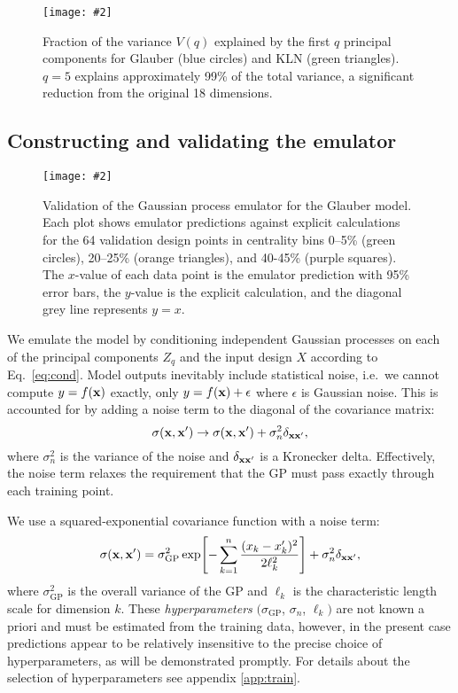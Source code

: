 \documentclass[aps,prc,reprint,superscriptaddress,amsmath]{revtex4-1}
\newcommand{\colfig}[3][t]{
  \begin{figure}[#1]
    \texttt{[image: \#2]}
    \caption{\label{fig:#2}#3}
  \end{figure}
}
\newcommand{\widefig}[3][t]{
  \begin{figure*}[#1]
    \texttt{[image: \#2]}
    \caption{\label{fig:#2}#3}
  \end{figure*}
}
\begin{document}
\colfig[t]{pc_var}{
  Fraction of the variance $V(q)$ explained by the first $q$ principal components for Glauber (blue circles) and KLN (green triangles).
  $q = 5$ explains approximately 99\% of the total variance, a significant reduction from the original 18 dimensions.
}

\subsection{Constructing and validating the emulator}

\widefig{validation}{
  Validation of the Gaussian process emulator for the Glauber model.
  Each plot shows emulator predictions against explicit calculations for the 64 validation design points in centrality bins 0--5\% (green circles), 20--25\% (orange triangles), and 40-45\% (purple squares).
  The $x$-value of each data point is the emulator prediction with 95\% error bars, the $y$-value is the explicit calculation, and the diagonal grey line represents $y = x$.
}

We emulate the model by conditioning independent Gaussian processes on each of the principal components $Z_q$ and the input design $X$ according to Eq.~\eqref{eq:cond}.
Model outputs inevitably include statistical noise, i.e.\ we cannot compute $y = f(\mathbf x)$ exactly, only $y = f(\mathbf x) + \epsilon$ where $\epsilon$ is Gaussian noise.
This is accounted for by adding a noise term to the diagonal of the covariance matrix:
\begin{equation*}
  \sigma(\mathbf x, \mathbf x') \rightarrow \sigma(\mathbf x, \mathbf x') + \sigma^2_n\delta_{\mathbf x\mathbf x'},
\end{equation*}
where $\sigma^2_n$ is the variance of the noise and $\delta_{\mathbf x\mathbf x'}$ is a Kronecker delta.
Effectively, the noise term relaxes the requirement that the GP must pass exactly through each training point.

We use a squared-exponential covariance function with a noise term:
\begin{equation}
  \sigma(\mathbf x, \mathbf x') = \sigma_\text{GP}^2 \exp\Biggl[ -\sum_{k=1}^n \frac{(x_k - x'_k)^2}{2\ell_k^2} \Biggr] + \sigma_n^2\delta_{\mathbf x\mathbf x'},
  \label{eq:full_cov}
\end{equation}
where $\sigma_\text{GP}^2$ is the overall variance of the GP and $\ell_k$ is the characteristic length scale for dimension $k$.
These \emph{hyperparameters} $(\sigma_\text{GP}$, $\sigma_n$, $\ell_k)$ are not known a priori and must be estimated from the training data, however, in the present case predictions appear to be relatively insensitive to the precise choice of hyperparameters, as will be demonstrated promptly.
For details about the selection of hyperparameters see appendix \ref{app:train}.
\end{document}
